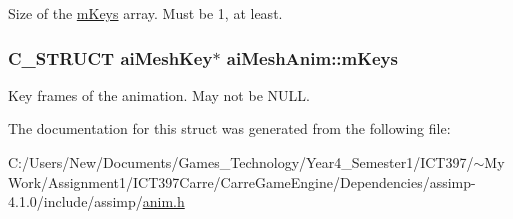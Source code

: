 Size of the \hyperlink{structai_mesh_anim_bc78e9f6d7583c541447e8c389488f1b}{mKeys} array. Must be 1, at least. \hypertarget{structai_mesh_anim_bc78e9f6d7583c541447e8c389488f1b}{
\subsubsection[mKeys]{\setlength{\rightskip}{0pt plus 5cm}C\_\-STRUCT {\bf aiMeshKey}$\ast$ {\bf aiMeshAnim::mKeys}}}
\label{structai_mesh_anim_bc78e9f6d7583c541447e8c389488f1b}


Key frames of the animation. May not be NULL. 

The documentation for this struct was generated from the following file:\begin{CompactItemize}
\item 
C:/Users/New/Documents/Games\_\-Technology/Year4\_\-Semester1/ICT397/$\sim$My Work/Assignment1/ICT397Carre/CarreGameEngine/Dependencies/assimp-4.1.0/include/assimp/\hyperlink{anim_8h}{anim.h}\end{CompactItemize}
